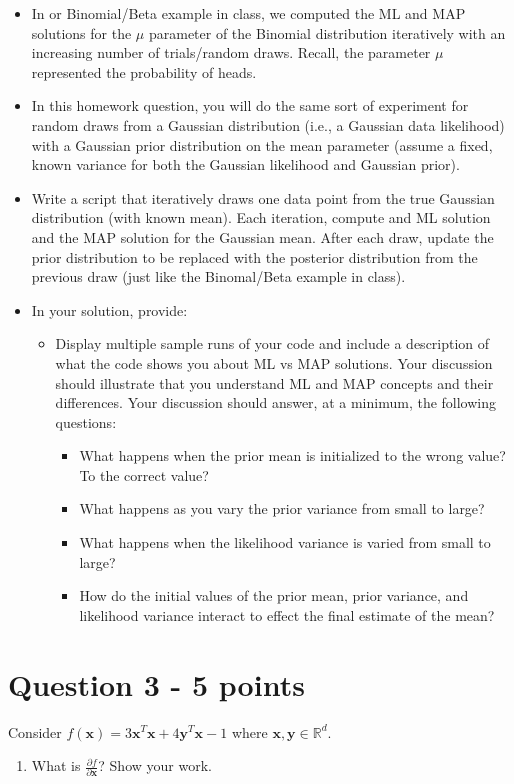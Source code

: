 \documentclass[11pt]{article}
\begin{document}
\begin{itemize}
	\item In or Binomial/Beta example in class, we computed the ML and MAP solutions for the $\mu$ parameter of the Binomial distribution iteratively with an increasing number of trials/random draws. Recall, the parameter $\mu$ represented the probability of heads.
	\item In this homework question, you will do the same sort of experiment for random draws from a Gaussian distribution (i.e., a Gaussian data likelihood) with a Gaussian prior distribution on the mean parameter (assume a fixed, known variance for both the Gaussian likelihood and Gaussian prior).
	\item Write a script that iteratively draws one data point from the true Gaussian distribution (with known mean). Each iteration, compute and ML solution and the MAP solution for the Gaussian mean. After each draw, update the prior distribution to be replaced with the posterior distribution from the previous draw (just like the Binomal/Beta example in class).
	\item In your solution, provide:
		\begin{itemize}
			\item Display multiple sample runs of your code and include a description of what the code shows you about ML vs MAP solutions. Your discussion should illustrate that you understand ML and MAP concepts and their differences. Your discussion should answer, at a minimum, the following questions:
			\begin{itemize}
				\item What happens when the prior mean is initialized to the wrong value? To the correct value?
				\item What happens as you vary the prior variance from small to large?
				\item What happens when the likelihood variance is varied from small to large?
				\item How do the initial values of the prior mean, prior variance, and likelihood variance interact to effect the final estimate of the mean?
			\end{itemize}
		\end{itemize}
\end{itemize}

\section*{Question 3 - 5 points}
Consider $f(\mathbf{x}) = 3\mathbf{x}^T\mathbf{x} + 4\mathbf{y}^T\mathbf{x} - 1$ where $\mathbf{x}, \mathbf{y} \in \mathbb{R}^d$. 
\begin{enumerate} 
\item What is $\frac{\partial f}{\partial\mathbf{x}}$? Show your work. 
\end{enumerate}
\end{document}
